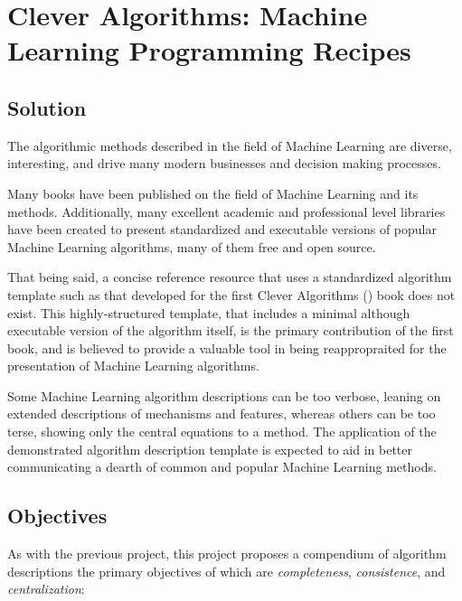 \documentclass[a4paper, 11pt]{article}
\begin{document}
\section{Clever Algorithms: Machine Learning Programming Recipes}
\label{sec:project}

\subsection{Solution}
The algorithmic methods described in the field of Machine Learning are diverse, interesting, and drive many modern businesses and decision making processes. 

Many books have been published on the field of Machine Learning and its methods. Additionally, many excellent academic and professional level libraries have been created to present standardized and executable versions of popular Machine Learning algorithms, many of them free and open source. 

That being said, a concise reference resource that uses a standardized algorithm template such as that developed for the first Clever Algorithms (\cite{Brownlee2010a}) book does not exist. This highly-structured template, that includes a minimal although executable version of the algorithm itself, is the primary contribution of the first book, and is believed to provide a valuable tool in being reappropraited for the presentation of Machine Learning algorithms. 

Some Machine Learning algorithm descriptions can be too verbose, leaning on extended descriptions of mechanisms and features, whereas others can be too terse, showing only the central equations to a method. The application of the demonstrated algorithm description template is expected to aid in better communicating a dearth of common and popular Machine Learning methods.

\subsection{Objectives}
As with the previous project, this project proposes a compendium of algorithm descriptions the primary objectives of which are \emph{completeness}, \emph{consistence}, and \emph{centralization}:
\end{document}

